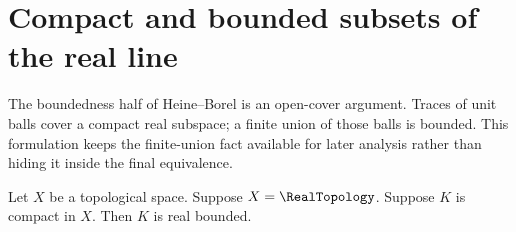 \section{Compact and bounded subsets of the real line}







The boundedness half of Heine--Borel is an open-cover argument.  Traces of
unit balls cover a compact real subspace; a finite union of those balls is
bounded.  This formulation keeps the finite-union fact available for later
analysis rather than hiding it inside the final equivalence.

\begin{theorem}\label{compact_real_subset_is_bounded}
    Let $X$ be a topological space.
    Suppose $X=\RealTopology$.
    Suppose $K$ is compact in $X$.
    Then $K$ is real bounded.
\end{theorem}

